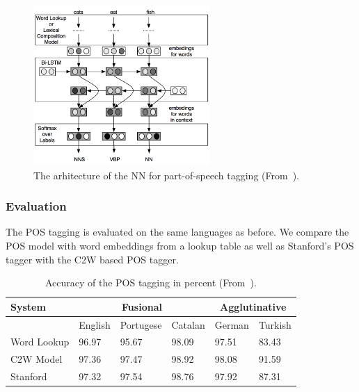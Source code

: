 \begin{figure}[H]
\begin{center}
  \includegraphics[width=0.6\textwidth]{./img/part-of-speech}
  \caption{The arhitecture of the NN for part-of-speech tagging (From~\cite{DBLP:journals/corr/LingLMAADBT15}).}
  \label{fig:part-of-speech}
\end{center}
\end{figure}

\subsubsection{Evaluation}

The POS tagging is evaluated on the same languages as before. We compare the POS model with word embeddings from a lookup table
as well as Stanford’s POS tagger with the C2W based POS tagger.
\begin{table}
\begin{center}
\begin{tabular}{ l l l l l l }
  \hline
  System       & \multicolumn{3}{|c|}{Fusional} &   \multicolumn{2}{|c|}{Agglutinative} \\ \hline
               & English & Portugese & Catalan & German & Turkish \\
  Word Lookup  & 96.97   & 95.67     &  98.09  & 97.51  & 83.43   \\
  C2W Model    & 97.36   & 97.47     &  98.92  & 98.08  & 91.59   \\
  Stanford     & 97.32   & 97.54     &  98.76  & 97.92  & 87.31  \\

\end{tabular}
\end{center}
\caption{Accuracy of the POS tagging in percent (From~\cite{DBLP:journals/corr/LingLMAADBT15}).}
\label{tab:pos-eval}
\end{table}


